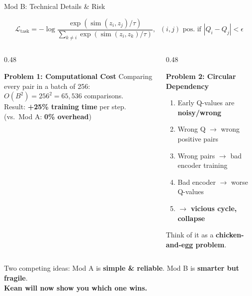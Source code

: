 \documentclass[aspectratio=169]{beamer}
\newcommand{\highlight}[1]{\textcolor{AccentOrange}{\textbf{#1}}}
\newcommand{\good}[1]{\textcolor{SuccessGreen}{\textbf{#1}}}
\newcommand{\bad}[1]{\textcolor{DangerRed}{\textbf{#1}}}
\begin{document}
\begin{frame}[shrink=3]{Mod B: Technical Details \& Risk}

\vspace{-0.3em}
{\small
\begin{equation*}
\mathcal{L}_{\text{task}} = -\log \frac{\exp(\operatorname{sim}(z_i, z_j) / \tau)}{\sum_{k \neq i} \exp(\operatorname{sim}(z_i, z_k) / \tau)}, \;\; (i,j)\text{ pos.\ if } |Q_i - Q_j| < \epsilon
\end{equation*}
}
\vspace{-0.3em}

\small
\begin{columns}[T]
\begin{column}{0.48\textwidth}
\begin{alertblock}{\bad{Problem 1: Computational Cost}}
Comparing every pair in a batch of 256:\\
$O(B^2) = 256^2 = 65{,}536$ comparisons.\\
Result: \bad{+25\% training time} per step.\\
(vs.\ Mod A: \good{0\% overhead})
\end{alertblock}
\end{column}
\begin{column}{0.48\textwidth}
\begin{alertblock}{\bad{Problem 2: Circular Dependency}}
\begin{enumerate}\setlength{\itemsep}{1pt}
    \item Early Q-values are \bad{noisy/wrong}
    \item Wrong Q $\to$ wrong positive pairs
    \item Wrong pairs $\to$ bad encoder training
    \item Bad encoder $\to$ worse Q-values
    \item $\to$ \bad{vicious cycle, collapse}
\end{enumerate}
\vspace{0.1em}
{\footnotesize Think of it as a \highlight{chicken-and-egg problem}.}
\end{alertblock}
\end{column}
\end{columns}

\vspace{0.3em}
\centering
{\small Two competing ideas: Mod A is \good{simple \& reliable}. Mod B is \highlight{smarter but fragile}.}\\
{\small \textbf{Kean will now show you which one wins.}}
\end{frame}
\end{document}
